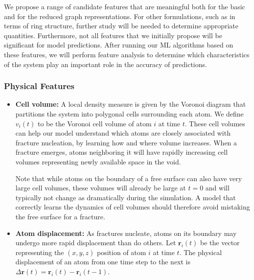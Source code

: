 We propose a range of candidate features that are meaningful both for the basic and for the reduced graph representations.  For other formulations, such as in terms of ring structure, further study will be needed to determine appropriate quantities.  Furthermore, not all features that we initially propose will be significant for model predictions.  After running our ML algorithms based on these features, we will perform feature analysis to determine which characteristics of the system play an important role in the accuracy of predictions.

\subsubsection{Physical Features}
\label{subsubsec: Physical Features}

\begin{itemize}
    
    \item \textbf{Cell volume:} A local density measure is given by the Voronoi diagram that partitions the system into polygonal cells surrounding each atom.  We define $v_i(t)$ to be the Voronoi cell volume of atom $i$ at time $t$.  These cell volumes can help our model understand which atoms are closely associated with fracture nucleation, by learning how and where volume increases.  When a fracture emerges, atoms neighboring it will have rapidly increasing cell volumes representing newly available space in the void.
    
    Note that while atoms on the boundary of a free surface can also have very large cell volumes, these volumes will already be large at $t=0$ and will typically not change as dramatically during the simulation.  A model that correctly learns the dynamics of cell volumes should therefore avoid mistaking the free surface for a fracture.

    \item \textbf{Atom displacement:} As fractures nucleate, atoms on its boundary may undergo more rapid displacement than do others.  Let $\mathbf{r}_i(t)$ be the vector representing the $(x,y,z)$ position of atom $i$ at time $t$. The physical displacement of an atom from one time step to the next is $\Delta \mathbf{r}(t)=\mathbf{r}_i(t)-\mathbf{r}_i(t-1)$.
    

\end{itemize}
